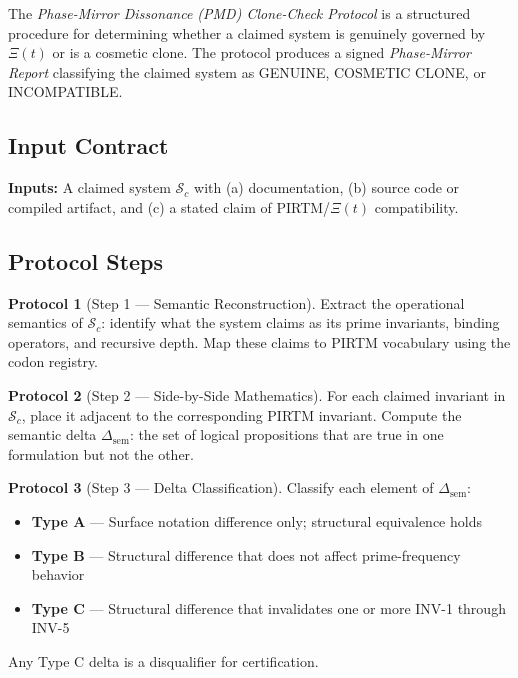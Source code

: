 \documentclass[12pt,letterpaper]{article}
\theoremstyle{definition}
\newtheorem{protocol}{Protocol}[section]
\theoremstyle{remark}
\begin{document}
The \emph{Phase-Mirror Dissonance (PMD) Clone-Check Protocol} is a structured procedure for determining whether a claimed system is genuinely governed by $\Xi(t)$ or is a cosmetic clone. The protocol produces a signed \emph{Phase-Mirror Report} classifying the claimed system as GENUINE, COSMETIC CLONE, or INCOMPATIBLE.

\subsection{Input Contract}

\textbf{Inputs:} A claimed system $\mathcal{S}_c$ with (a) documentation, (b) source code or compiled artifact, and (c) a stated claim of PIRTM/$\Xi(t)$ compatibility.

\subsection{Protocol Steps}

\begin{protocol}[Step 1 --- Semantic Reconstruction]
Extract the operational semantics of $\mathcal{S}_c$: identify what the system claims as its prime invariants, binding operators, and recursive depth. Map these claims to PIRTM vocabulary using the codon registry.
\end{protocol}

\begin{protocol}[Step 2 --- Side-by-Side Mathematics]
For each claimed invariant in $\mathcal{S}_c$, place it adjacent to the corresponding PIRTM invariant. Compute the semantic delta $\Delta_{\mathrm{sem}}$: the set of logical propositions that are true in one formulation but not the other.
\end{protocol}

\begin{protocol}[Step 3 --- Delta Classification]
Classify each element of $\Delta_{\mathrm{sem}}$:
\begin{itemize}[noitemsep]
\item \textbf{Type A} --- Surface notation difference only; structural equivalence holds
\item \textbf{Type B} --- Structural difference that does not affect prime-frequency behavior
\item \textbf{Type C} --- Structural difference that invalidates one or more INV-1 through INV-5
\end{itemize}
Any Type C delta is a disqualifier for certification.
\end{protocol}
\end{document}
